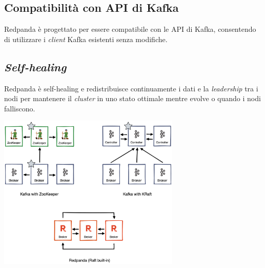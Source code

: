 \subsection{Compatibilità con API di Kafka}
Redpanda è progettato per essere compatibile con le API di Kafka, consentendo di utilizzare i \textit{client} Kafka esistenti senza modifiche.

\subsection{\textit{Self-healing}}
Redpanda è self-healing e redistribuisce continuamente i dati e la \textit{leadership} tra i nodi per mantenere il \textit{cluster} in uno stato ottimale mentre evolve o quando i nodi falliscono.


\begin{center}
	\includegraphics[width=0.65\textwidth]{imgs/kafka_zookeeper.png}
\end{center}












